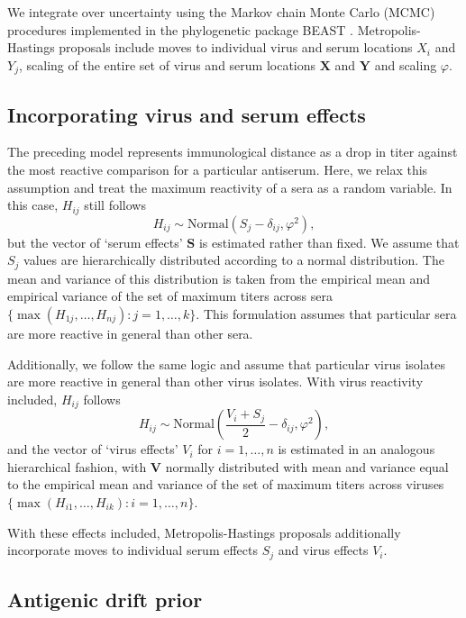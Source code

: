 \documentclass[11pt,oneside,letterpaper]{article}
\newcommand{\mdssd}{\varphi}						%
\newcommand{\vn}{n}									%
\newcommand{\sn}{k}									%
\begin{document}
We integrate over uncertainty using the Markov chain Monte Carlo (MCMC) procedures implemented in the phylogenetic package BEAST \cite{BEAST}.
Metropolis-Hastings proposals include moves to individual virus and serum locations $X_i$ and $Y_j$, scaling of the entire set of virus and serum locations $\mathbf{X}$ and $\mathbf{Y}$ and scaling $\mdssd$.

\subsection*{Incorporating virus and serum effects}

The preceding model represents immunological distance as a drop in titer against the most reactive comparison for a particular antiserum.  
Here, we relax this assumption and treat the maximum reactivity of a sera as a random variable.
In this case, $H_{ij}$ still follows
\begin{equation} 
	H_{ij} \sim \mbox{Normal}( S_j - \delta_{ij}, \mdssd^2 ),
\end{equation}
but the vector of `serum effects' $\mathbf{S}$ is estimated rather than fixed.
We assume that $S_j$ values are hierarchically distributed according to a normal distribution.
The mean and variance of this distribution is taken from the empirical mean and empirical variance of the set of maximum titers across sera $\{ \max ( H_{1j},\ldots,H_{\vn j} ) : j = 1,\ldots,\sn \}$.
This formulation assumes that particular sera are more reactive in general than other sera.

Additionally, we follow the same logic and assume that particular virus isolates are more reactive in general than other virus isolates.
With virus reactivity included, $H_{ij}$ follows
\begin{equation} 
	H_{ij} \sim \mbox{Normal}\left(  \frac{V_i+S_j}{2} - \delta_{ij}, \mdssd^2 \right),
\end{equation}
and the vector of `virus effects' $V_i$ for $i = 1,\ldots, \vn$ is estimated in an analogous hierarchical fashion, with $\mathbf{V}$ normally distributed with mean and variance equal to the empirical mean and variance of the set of maximum titers across viruses $\{ \max ( H_{i1},\ldots,H_{i \sn} ) : i = 1,\ldots,\vn \}$.

With these effects included, Metropolis-Hastings proposals additionally incorporate moves to individual serum effects $S_j$ and virus effects $V_i$.

\subsection*{Antigenic drift prior}
\end{document}
